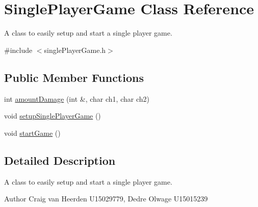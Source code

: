 \hypertarget{class_single_player_game}{\section{\-Single\-Player\-Game \-Class \-Reference}
\label{class_single_player_game}
}


\-A class to easily setup and start a single player game.  




{\ttfamily \#include $<$single\-Player\-Game.\-h$>$}

\subsection*{\-Public \-Member \-Functions}
\begin{DoxyCompactItemize}
\item 
int \hyperlink{class_single_player_game_ac742023693fe3801eab7c1a964a92d82}{amount\-Damage} (int \&, char ch1, char ch2)
\item 
void \hyperlink{class_single_player_game_a825a10c7d72d23a91d82b23684dc1971}{setup\-Single\-Player\-Game} ()
\item 
void \hyperlink{class_single_player_game_a4cdb10883124feabd077fa4b723e1237}{start\-Game} ()
\end{DoxyCompactItemize}


\subsection{\-Detailed \-Description}
\-A class to easily setup and start a single player game. 

\begin{DoxyAuthor}{\-Author}
\-Craig van \-Heerden \-U15029779, \-Dedre \-Olwage \-U15015239 
\end{DoxyAuthor}


